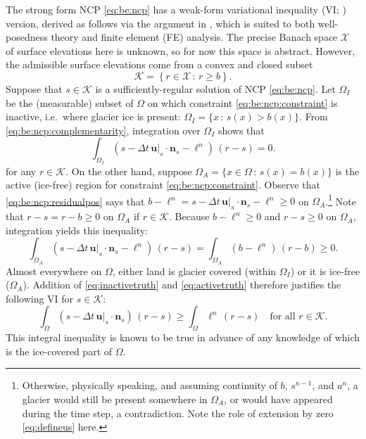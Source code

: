 \documentclass[hidelinks,onefignum,onetabnum,final]{siamart220329}  %
\newcommand{\bn}{\mathbf{n}}
\newcommand{\bu}{\mathbf{u}}
\newcommand{\cK}{\mathcal{K}}
\newcommand{\cX}{\mathcal{X}}
\begin{document}
The strong form NCP \eqref{eq:be:ncp} has a weak-form variational inequality (VI; \cite{Evans2010,KinderlehrerStampacchia1980}) version, derived as follows via the argument in \cite{Bueler2021conservation}, which is suited to both well-posedness theory and finite element (FE) analysis.  The precise Banach space $\cX$ of surface elevations here is unknown, so for now this space is abstract.  However, the admissible surface elevations come from a convex and closed subset
\begin{equation}
\cK = \left\{r \in\cX\,:\,r \ge b\right\}.  \label{eq:be:admissible}
\end{equation}
Suppose that $s \in \cK$ is a sufficiently-regular solution of NCP \eqref{eq:be:ncp}.  Let $\Omega_I$ be the (measurable) subset of $\Omega$ on which constraint \eqref{eq:be:ncp:constraint} is inactive, i.e.~where glacier ice is present: $\Omega_I = \{x\,:\,s(x)>b(x)\}$.  From \eqref{eq:be:ncp:complementarity}, integration over $\Omega_I$ shows that
\begin{equation}
\int_{\Omega_I} \left(s - \Delta t\,\bu|_s \cdot \bn_s - \ell^n\right)\,(r-s) = 0.  \label{eq:inactivetruth}
\end{equation}
for any $r\in\cK$.  On the other hand, suppose $\Omega_A = \{x \in \Omega \,:\,s(x)=b(x)\}$ is the active (ice-free) region for constraint \eqref{eq:be:ncp:constraint}.  Observe that \eqref{eq:be:ncp:residualpos} says that $b-\ell^n = s - \Delta t\,\bu|_s \cdot \bn_s - \ell^n \ge 0$ on $\Omega_A$.\footnote{Otherwise, physically speaking, and assuming continuity of $b$, $s^{n-1}$, and $a^n$, a glacier would still be present somewhere in $\Omega_A$, or would have appeared during the time step, a contradiction.  Note the role of extension by zero \eqref{eq:defineus} here.}  Note that $r-s=r-b\ge 0$ on $\Omega_A$ if $r\in\cK$.  Because $b-\ell^n \ge 0$ and $r-s\ge 0$ on $\Omega_A$, integration yields this inequality:
\begin{equation}
\int_{\Omega_A} \left(s - \Delta t\,\bu|_s \cdot \bn_s - \ell^n\right)\,(r-s) = \int_{\Omega_A} \left(b - \ell^n\right)\,(r-b) \ge 0.  \label{eq:activetruth}
\end{equation}
Almost everywhere on $\Omega$, either land is glacier covered (within $\Omega_I$) or it is ice-free ($\Omega_A$).  Addition of \eqref{eq:inactivetruth} and \eqref{eq:activetruth} therefore justifies the following VI for $s \in \cK$:
\begin{equation}
\int_\Omega \left(s - \Delta t\,\bu|_s \cdot \bn_s\right)\,(r-s) \ge \int_\Omega \ell^n \,(r-s) \quad \text{for all } r \in \cK. \label{eq:be:viearly}
\end{equation}
This integral inequality is known to be true in advance of any knowledge of which is the ice-covered part of $\Omega$.
	
\end{document}
